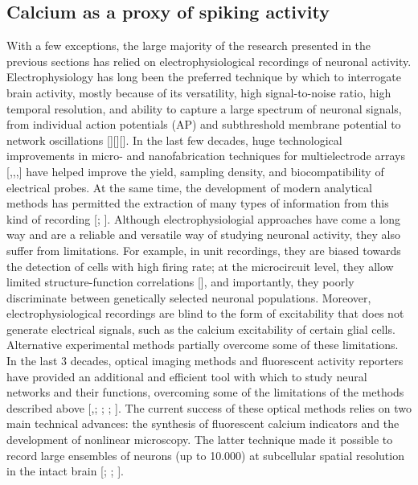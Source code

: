 \subsection{Calcium as a proxy of spiking activity}
\label{chap1:sec:1:subsec3:calcium_proxy_spikes}
With a few exceptions, the large majority of the research presented in the previous sections has relied on electrophysiological recordings of neuronal activity.  
Electrophysiology has long been the preferred technique by which to interrogate brain activity, mostly because of its versatility, high signal-to-noise ratio, high temporal resolution, and ability to capture a large spectrum of neuronal signals, from individual action potentials (AP) and subthreshold membrane potential to network oscillations [\cite{buzsaki2012}][\cite{margrie2003}][\cite{hubel1959}].
In the last few decades, huge technological improvements in micro- and nanofabrication techniques for multielectrode arrays [\cite{bareketkeren2012},\cite{spira2013},\cite{viventi2012},\cite{jun2017}] have helped improve the yield, sampling density, and biocompatibility of electrical probes.
At the same time, the development of modern analytical methods has permitted the extraction of many types of information from this kind of recording [\cite{agarwal2014}; \cite{sheinidelson2017}]. 
Although electrophysiologial approaches have come a long way and are a reliable and versatile way of studying neuronal activity, they also suffer from limitations. 
For example, in unit recordings, they are biased towards the detection of cells with high firing rate; at the microcircuit level, they allow limited structure-function correlations [\cite{dombeck2010}], and importantly, they poorly discriminate between genetically selected neuronal populations. 
Moreover, electrophysiological recordings are blind to the form of excitability that does not generate electrical signals, such as the calcium excitability of certain glial cells.
Alternative experimental methods partially overcome some of these limitations. 
In the last 3 decades, optical imaging methods and fluorescent activity reporters have provided an additional and efficient tool with which to study neural networks and their functions, overcoming some of the limitations of the methods described above [\cite{ohki2005},\cite{shoham1999}; \cite{grienberger2012}; \cite{bovetti2014}; \cite{yang2017}]. 
The current success of these optical methods relies on two main technical advances: the synthesis of fluorescent calcium indicators and the development of nonlinear microscopy. 
The latter technique made it possible to record large ensembles of neurons (up to 10.000) at subcellular spatial resolution in the intact brain [\cite{bovetti2014}; \cite{yang2017}; \cite{svoboda2006}].

